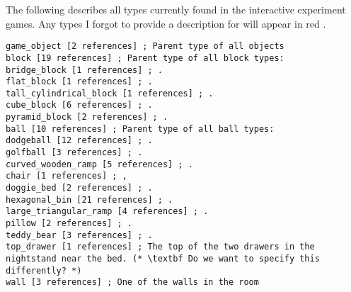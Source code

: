 \documentclass{article}
\begin{document}
            The following describes all types currently found in the interactive experiment games. Any types I forgot to provide a description for will appear in {\color{red}red }.
        
\begin{lstlisting}
game_object [2 references] ; Parent type of all objects
block [19 references] ; Parent type of all block types:
bridge_block [1 references] ; .
flat_block [1 references] ; .
tall_cylindrical_block [1 references] ; .
cube_block [6 references] ; .
pyramid_block [2 references] ; .
ball [10 references] ; Parent type of all ball types:
dodgeball [12 references] ; .
golfball [3 references] ; .
curved_wooden_ramp [5 references] ; .
chair [1 references] ; ,
doggie_bed [2 references] ; .
hexagonal_bin [21 references] ; .
large_triangular_ramp [4 references] ; .
pillow [2 references] ; .
teddy_bear [3 references] ; .
top_drawer [1 references] ; The top of the two drawers in the nightstand near the bed. (* \textbf Do we want to specify this differently? *)
wall [3 references] ; One of the walls in the room
\end{lstlisting}
\end{document}
